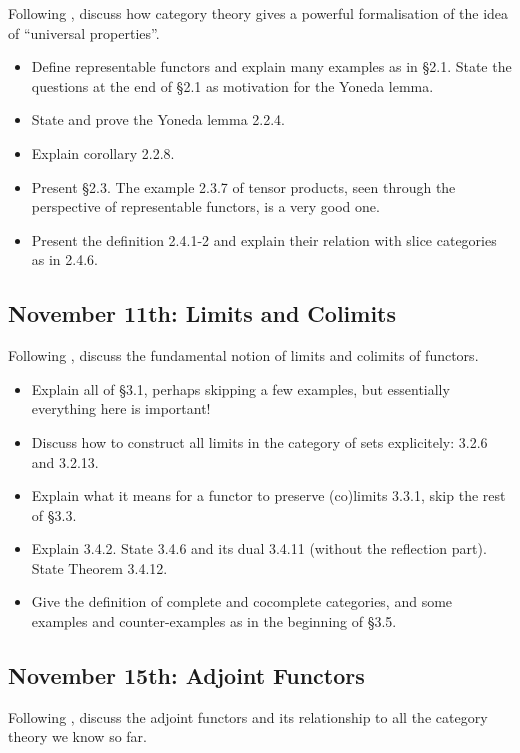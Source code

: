 \documentclass{amsart}
\theoremstyle{definition}
\theoremstyle{remark}
\begin{document}
Following \cite[Chapter 2]{Riehl_context}, discuss how category theory gives a powerful formalisation of the idea of ``universal properties''.

\begin{itemize}
\item Define representable functors and explain many examples as in \S 2.1. State the questions at the end of \S 2.1 as motivation for the Yoneda lemma.
\item State and prove the Yoneda lemma 2.2.4.
\item Explain corollary 2.2.8.
\item Present \S 2.3. The example 2.3.7 of tensor products, seen through the perspective of representable functors, is a very good one.
\item Present the definition 2.4.1-2 and explain their relation with slice categories as in 2.4.6.
\end{itemize}

\subsection{November 11th: Limits and Colimits}

Following \cite[Chapter 3]{Riehl_context}, discuss the fundamental notion of limits and colimits of functors.

\begin{itemize}
\item Explain all of \S 3.1, perhaps skipping a few examples, but essentially everything here is important!
\item Discuss how to construct all limits in the category of sets explicitely: 3.2.6 and 3.2.13.
\item Explain what it means for a functor to preserve (co)limits 3.3.1, skip the rest of \S 3.3.
\item Explain 3.4.2. State 3.4.6 and its dual 3.4.11 (without the reflection part). State Theorem 3.4.12.
\item Give the definition of complete and cocomplete categories, and some examples and counter-examples as in the beginning of \S 3.5.
\end{itemize}

\subsection{November 15th: Adjoint Functors}

Following \cite[Chapter 4]{Riehl_context}, discuss the adjoint functors and its relationship to all the category theory we know so far.
\end{document}
